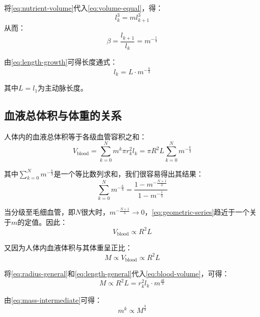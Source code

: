 将\cref{eq:nutrient-volume}代入\cref{eq:volume-equal}，得：
\begin{equation}
l_k^3 = ml_{k+1}^3
\end{equation}
从而：
\begin{equation}
\beta = \frac{l_{k+1}}{l_k} = m^{-\frac{1}{3}}
\label{eq:length-growth}
\end{equation}

由\cref{eq:length-growth}可得长度通式：
\begin{equation}
l_k = L \cdot m^{-\frac{k}{3}}
\label{eq:length-general}
\end{equation}

其中$L = l_1$为主动脉长度。

\subsection{血液总体积与体重的关系}

人体内的血液总体积等于各级血管容积之和：
\begin{equation}
V_{\text{blood}} = \sum_{k=0}^{N} m^k \pi r_k^2 l_k = \pi R^2 L \sum_{k=0}^{N} m^{-\frac{k}{3}}
\label{eq:blood-volume}
\end{equation}

其中$\sum_{k=0}^{N} m^{-\frac{k}{3}}$是一个等比数列求和，我们很容易得出其结果：
\begin{equation}
\sum_{k=0}^{N} m^{-\frac{k}{3}} = \frac{1 - m^{-\frac{N+1}{3}}}{1 - m^{-\frac{1}{3}}}
\label{eq:geometric-series}
\end{equation}

当分级至毛细血管，即$N$很大时，$m^{-\frac{N+1}{3}} \to 0$，\cref{eq:geometric-series}趋近于一个关于$m$的定值。因此：
\begin{equation}
V_{\text{blood}} \propto R^2 L
\label{eq:blood-proportional}
\end{equation}

又因为人体内血液体积与其体重呈正比：
\begin{equation}
M \propto V_{\text{blood}} \propto R^2 L
\label{eq:mass-volume}
\end{equation}

将\cref{eq:radius-general}和\cref{eq:length-general}代入\cref{eq:blood-volume}，可得：
\begin{equation}
M \propto R^2 L = r_k^2 l_k \cdot m^{\frac{4k}{3}}
\label{eq:mass-intermediate}
\end{equation}

由\cref{eq:mass-intermediate}可得：
\begin{equation}
m^k \propto M^{\frac{3}{4}}
\label{eq:capillary-count}
\end{equation}

